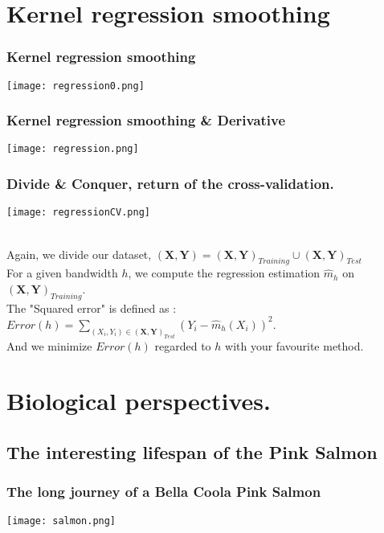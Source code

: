 \documentclass[10pt]{beamer}
\begin{document}
 \section{Kernel regression smoothing}

\begin{frame}
\frametitle{Kernel regression smoothing}
	\begin{center}
       \texttt{[image: regression0.png]}
	\end{center}
\end{frame}


\begin{frame}
\frametitle{Kernel regression smoothing \& Derivative}
	\begin{center}
       \texttt{[image: regression.png]}
	\end{center}
\end{frame}

\begin{frame}	
\frametitle{\textbf{Divide \& Conquer}, return of the cross-validation.}
	\begin{center}
       \texttt{[image: regressionCV.png]}
       \begin{scriptsize}\\
  Again, we divide our dataset, $(\pmb{X},\pmb{Y})=(\pmb{X},\pmb{Y})_{Training} \cup (\pmb{X},\pmb{Y})_{Test}$  \\ For a given bandwidth $h$, we compute the regression estimation $\widehat{m}_h$ on $(\pmb{X},\pmb{Y})_{Training}$. \\The "Squared error" is defined as : 
       $ Error(h)=\sum_{(X_i,Y_i) \in (\pmb{X},\pmb{Y})_{Test}} \left( Y_i- \widehat{m}_h(X_i) \right) ^2 $.\\
       And we minimize $Error(h)$ regarded to $h$ with your favourite method. 
\end{scriptsize}
	\end{center}
\end{frame}


\section{Biological perspectives.}

\subsection{The interesting lifespan of the Pink Salmon}
\begin{frame}	
\frametitle{The long journey of a Bella Coola Pink Salmon}
	\begin{center}
       \texttt{[image: salmon.png]}
	\end{center}
\end{frame}
\end{document}
